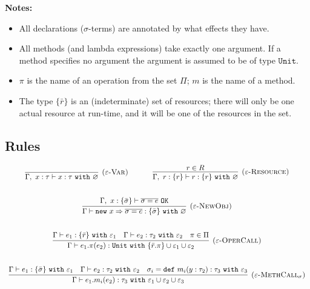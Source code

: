 \documentclass{llncs}
\newcommand{\keywadj}[1]{\mathtt{#1}}
\newcommand{\keyw}[1]{\keywadj{#1}~}
\begin{document}
\noindent \textbf{Notes:}

\begin{itemize}
	\item All declarations ($\sigma$-terms) are annotated by what effects they have.
	\item All methods (and lambda expressions) take exactly one argument. If a method specifies no argument the argument is assumed to be of type $\keywadj{Unit}$.
	\item $\pi$ is the name of an operation from the set $\Pi$; $m$ is the name of a method.
	\item The type $\{ \bar r \}$ is an (indeterminate) set of resources; there will only be one actual resource at run-time, and it will be one of the resources in the set.
\end{itemize}

\subsection{Rules}

\fbox{$\Gamma \vdash e : \tau~\keyw{with} \varepsilon$}

\[
\begin{array}{c}
\infer[\textsc{($\varepsilon$-Var)}]
  {\Gamma,~x:\tau \vdash x:\tau~ \keyw{with} \varnothing}
  {} 
~~~~~~~~~~
\infer[\textsc{($\varepsilon$-Resource)}]
  {\Gamma,~r :\{r\} \vdash r:\{ r \} ~ \keyw{with} \varnothing}
  {r \in R} \\[5ex]

\infer[\textsc{($\varepsilon$-NewObj)}]
	{\Gamma \vdash \keywadj{new}~x \Rightarrow \overline{\sigma = e} : \{ \bar \sigma \}~\keyw{with} \varnothing}
	{\Gamma,~x : \{ \bar \sigma \} \vdash \overline{\sigma = e}~\keywadj{OK}} \\[5ex]

\infer[\textsc{($\varepsilon$-OperCall)}]
	{\Gamma \vdash e_1.\pi(e_2) : \keyw{Unit} \keyw{with} \{ \bar r.\pi \} \cup \varepsilon_1 \cup \varepsilon_2}
	{\Gamma \vdash e_1 : \{ \bar r \}~ \keyw{with} \varepsilon_1 & \Gamma \vdash e_2:\tau_2~\keyw{with} \varepsilon_2 & \pi \in \Pi} \\[5ex]
	
\infer[\textsc{($\varepsilon$-MethCall$_\sigma$)}]
	{\Gamma \vdash e_1.m_i(e_2):\tau_3~\keyw{with} \varepsilon_1 \cup \varepsilon_2 \cup \varepsilon_3}
	{\Gamma \vdash e_1 : \{ \bar \sigma \}~\keyw{with} \varepsilon_1 & \Gamma \vdash e_2 : \tau_2~\keyw{with} \varepsilon_2 & \sigma_i = \keyw{def} m_i(y:\tau_2):\tau_3~\keyw{with} \varepsilon_3}

\end{array}
\]
\end{document}
